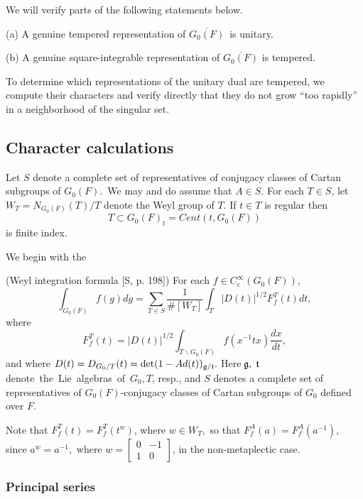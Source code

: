We will verify parts of the following statements below.

\begin{conjecture}
(a) A genuine tempered representation of $\overline{G_0(F)}$\ is unitary.

(b) A genuine square-integrable representation of $\overline{G_0(F)}$ is
tempered.
\end{conjecture}

To determine which representations of the unitary dual are tempered, we
compute their characters and verify directly that they do not grow ``too
rapidly'' in a neighborhood of the singular set.

\subsection{Character calculations}

Let $S$ denote a complete set of representatives of conjugacy classes of
Cartan subgroups of $G_0(F)$.\ We may and do assume that $A\in S.$ For each $%
T\in S$, let $W_T=N_{G_0(F)}(T)/T$ denote the Weyl group of $T$. If $t\in T$
is regular then 
\[
T\subset G_0(F)_t=Cent(t,G_0(F)) 
\]
is finite index.

We begin with the

\begin{lemma}
(Weyl integration formula [S, p. 198]) For each $f\in C_c^\infty (G_0(F)),$%
\[
\int_{G_0(F)}f(g)dg=\sum_{T\in S}\frac
1{\#[W_T]}\int_T|D(t)|^{1/2}F_f^T(t)dt,
\]
where 
\[
F_f^T(t)=|D(t)|^{1/2}\int_{T\backslash G_0(F)}f(x^{-1}tx)\frac{dx}{dt},
\]
and where $D(t)=D_{G_0/T}(t)=\det (1-Ad(t))_{{\frak g}/{\frak t}}.\;$Here$\;%
{\frak g},\;{\frak t}\;$denote\ the\ Lie\ algebras\ of\ $G_0,T$, resp., and $%
S$ denotes a complete set of representatives of $G_0(F)$-conjugacy classes
of Cartan subgroups of $G_0$ defined over $F$.
\end{lemma}

Note that $F_f^T(t)=F_f^T(t^w)$, where $w\in W_T,$ so that $%
F_f^A(a)=F_f^A(a^{-1}),$ since $a^w=a^{-1},$ where $w=\left[ 
\begin{array}{cc}
0 & -1 \\ 
1 & 0
\end{array}
\right] $, in the non-metaplectic case.

\subsubsection{Principal series}

